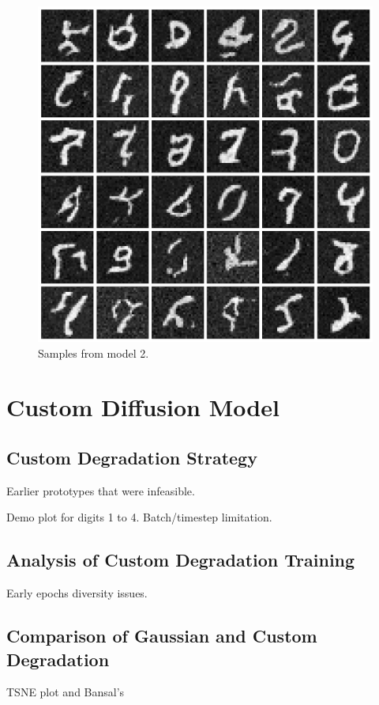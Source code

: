 \documentclass[12pt]{article}
\begin{document}
\begin{figure}[hp]
    \includegraphics[scale=0.3]{figures/samples_2.png}
    \caption{Samples from model 2.}
    \label{fig:samples_2}
\end{figure}


\section{Custom Diffusion Model}


\subsection{Custom Degradation Strategy}

Earlier prototypes that were infeasible.

Demo plot for digits 1 to 4.
Batch/timestep limitation.


\subsection{Analysis of Custom Degradation Training}
Early epochs diversity issues.
\subsection{Comparison of Gaussian and Custom Degradation}
TSNE plot and Bansal's
\end{document}
